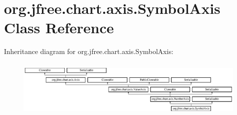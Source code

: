 \hypertarget{classorg_1_1jfree_1_1chart_1_1axis_1_1_symbol_axis}{}\section{org.\+jfree.\+chart.\+axis.\+Symbol\+Axis Class Reference}
\label{classorg_1_1jfree_1_1chart_1_1axis_1_1_symbol_axis}
Inheritance diagram for org.\+jfree.\+chart.\+axis.\+Symbol\+Axis\+:\begin{figure}[H]
\begin{center}
\leavevmode
\includegraphics[height=2.800000cm]{classorg_1_1jfree_1_1chart_1_1axis_1_1_symbol_axis}
\end{center}
\end{figure}
